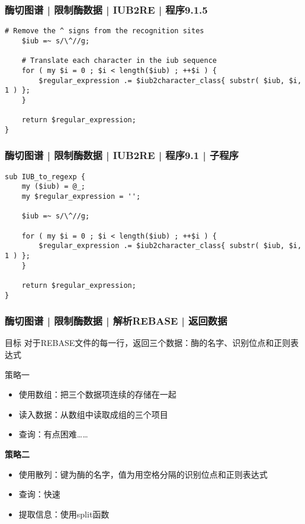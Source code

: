 \begin{frame}[fragile]
  \frametitle{酶切图谱 | 限制酶数据 | IUB2RE | 程序9.1.5}
\begin{lstlisting}[firstnumber=46]
    # Remove the ^ signs from the recognition sites
    $iub =~ s/\^//g;

    # Translate each character in the iub sequence
    for ( my $i = 0 ; $i < length($iub) ; ++$i ) {
        $regular_expression .= $iub2character_class{ substr( $iub, $i, 1 ) };
    }

    return $regular_expression;
}
\end{lstlisting}
\end{frame}

\begin{frame}[fragile]
  \frametitle{酶切图谱 | 限制酶数据 | IUB2RE | 程序9.1 | \alert{子程序}}
\begin{lstlisting}
sub IUB_to_regexp {
    my ($iub) = @_;
    my $regular_expression = '';

    $iub =~ s/\^//g;

    for ( my $i = 0 ; $i < length($iub) ; ++$i ) {
        $regular_expression .= $iub2character_class{ substr( $iub, $i, 1 ) };
    }

    return $regular_expression;
}
\end{lstlisting}
\end{frame}

\begin{frame}
  \frametitle{酶切图谱 | 限制酶数据 | 解析REBASE | 返回数据}
  \begin{block}{目标}
    对于REBASE文件的每一行，返回三个数据：酶的名字、识别位点和正则表达式
  \end{block}
  \pause
  \begin{block}{策略一}
    \begin{itemize}
      \item 使用数组：把三个数据项连续的存储在一起
      \item 读入数据：从数组中读取成组的三个项目
      \item 查询：有点困难……
    \end{itemize}
  \end{block}
  \pause
  \begin{block}{\textbf{策略二}}
    \begin{itemize}
      \item 使用散列：键为酶的名字，值为用空格分隔的识别位点和正则表达式
      \item 查询：快速
      \item 提取信息：使用split函数
    \end{itemize}
  \end{block}
\end{frame}

